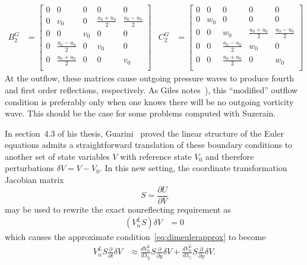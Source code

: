 \documentclass[letterpaper,11pt,nointlimits,reqno,draft]{amsart}
\begin{document}
\begin{align}
\label{eq:dimeulerapproxmedidaopt2}
  B^G_2 &= \left[\begin{array}{ccccc}
    0 & 0                 & 0   & 0                   & 0                 \\
    0 & v_0               & 0   & \frac{a_0 + u_0}{2} & \frac{a_0-u_0}{2} \\
    0 & 0                 & v_0 & 0                   & 0                 \\
    0 & \frac{a_0-u_0}{2} & 0   & v_0                 & 0                 \\ \hline
    0 & \frac{a_0+u_0}{2} & 0   & 0                   & v_0               \\
  \end{array}\right]
&
  C^G_2 &= \left[\begin{array}{ccccc}
    0 & 0   & 0                 & 0                 & 0                 \\
    0 & w_0 & 0                 & 0                 & 0                 \\
    0 & 0   & w_0               & \frac{a_0+u_0}{2} & \frac{a_0-u_0}{2} \\
    0 & 0   & \frac{a_0-u_0}{2} & w_0               & 0                 \\ \hline
    0 & 0   & \frac{a_0+u_0}{2} & 0                 & w_0               \\
  \end{array}\right]
\end{align}
At the outflow, these matrices cause outgoing pressure waves to produce fourth
and first order reflections, respectively.  As Giles
notes~\cite{Giles1990Nonreflecting}), this ``modified'' outflow condition is
preferably only when one knows there will be no outgoing vorticity wave.
This should be the case for some problems computed with Suzerain.

In section~4.3 of his thesis, Guarini~\cite{Guarini1998} proved the linear
structure of the Euler equations admits a straightforward translation of these
boundary conditions to another set of state variables $V$ with reference state
$V_0$ and therefore perturbations $\delta{}V = V - V_0$.  In this new setting,
the coordinate transformation Jacobian matrix
$$
   S = \frac{\partial{}U}{\partial{}V}
$$
may be used to rewrite the exact nonreflecting requirement as
\begin{align}
  \left(V_n^L S\right) \delta{}V &= 0
\end{align}
which causes the approximate condition~\eqref{eq:dimeulerapprox} to become
\begin{align}
\label{eq:dimeulertransform}
  V_n^L
  S
  \frac{\partial}{\partial{}t}
  \delta{}V
  &\approx
  \frac{dV_n^L}{d\lambda_y}
  S
  \frac{\partial}{\partial{}y}
  \delta{}V
  +
  \frac{dV_n^L}{d\lambda_z}
  S
  \frac{\partial}{\partial{}y}
  \delta{}V
  .
\end{align}
\end{document}
